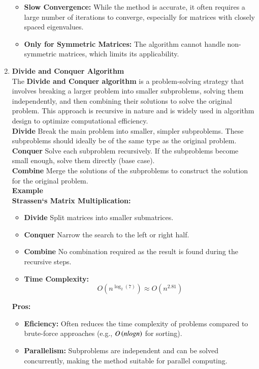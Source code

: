 \documentclass[journal]{IEEEtran}
\begin{document}
\begin{enumerate}
\begin{itemize}
\item \textbf{Slow Convergence:} While the method is accurate, it often requires a large number of iterations to converge, especially for matrices with closely spaced eigenvalues.
\item \textbf{Only for Symmetric Matrices:} The algorithm cannot handle non-symmetric matrices, which limits its applicability.
\end{itemize}
\item \textbf{Divide and Conquer Algorithm} \\
The \textbf{Divide and Conquer algorithm} is a problem-solving strategy that involves breaking a larger problem into smaller subproblems, solving them independently, and then combining their solutions to solve the original problem. This approach is recursive in nature and is widely used in algorithm design to optimize computational efficiency.\\
\textbf{Divide} Break the main problem into smaller, simpler subproblems. These subproblems should ideally be of the same type as the original problem.\\
\textbf{Conquer} Solve each subproblem recursively. If the subproblems become small enough, solve them directly (base case).\\
\textbf{Combine} Merge the solutions of the subproblems to construct the solution for the original problem.\\ 
\textbf{Example} \\
\textbf{Strassen`s Matrix Multiplication:} 
\begin{itemize} 
\item \textbf{Divide} Split matrices into smaller submatrices.
\item \textbf{Conquer} Narrow the search to the left or right half.
\item \textbf{Combine} No combination required as the result is found during the recursive steps.
\item \textbf{Time Complexity:} 
\[
O\left(n^{\log_2(7)}\right) \approx O\left(n^{2.81}\right)
\]
\end{itemize}
\textbf{Pros:} 
\begin{itemize}
\item \textbf{Eficiency:} Often reduces the time complexity of problems compared to brute-force approaches (e.g., $O\left(nlogn\right)$ for sorting).
\item \textbf{Parallelism:} Subproblems are independent and can be solved concurrently, making the method suitable for parallel computing.

\end{itemize}
\end{enumerate}
\end{document}
